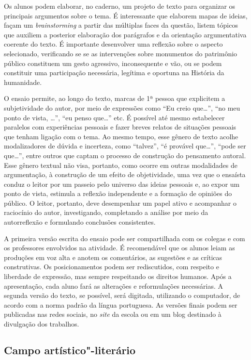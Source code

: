 \documentclass[11pt]{extarticle}
\begin{document}
\begin{enumerate}
\begin{enumerate}
\begin{enumerate}
Os alunos podem elaborar, no caderno, um projeto de texto para organizar
os principais argumentos sobre o tema. É interessante que elaborem mapas
de ideias, façam um \emph{brainstorming} a partir das múltiplas faces da
questão, listem tópicos que auxiliem a posterior elaboração dos
parágrafos e da orientação argumentativa coerente do texto. É importante
desenvolver uma reflexão sobre o aspecto selecionado, verificando se se
as intervenções sobre monumentos do patrimônio público constituem um
gesto agressivo, inconsequente e vão, ou se podem constituir uma
participação necessária, legítima e oportuna na História da humanidade.

O ensaio permite, ao longo do texto, marcas de 1ª pessoa que explicitem
a subjetividade do autor, por meio de expressões como ``Eu creio
que\ldots{}'', ``no meu ponto de vista, \ldots{}'', ``eu penso que\ldots{}'' etc. É
possível até mesmo estabelecer paralelos com experiências pessoais e
fazer breves relatos de situações pessoais que tenham ligação com o
tema. Ao mesmo tempo, esse gênero de texto acolhe modalizadores de
dúvida e incerteza, como ``talvez'', ``é provável que\ldots{}'', ``pode ser
que\ldots{}'', entre outros que captam o processo de construção do pensamento
autoral. Esse gênero textual não visa, portanto, como ocorre em outras
modalidades de argumentação, à construção de um efeito de objetividade,
uma vez que o ensaísta conduz o leitor por um passeio pelo universo das
ideias pessoais e, ao expor um ponto de vista, estimula a reflexão
independente e a formação de opiniões do público. O leitor, portanto,
deve desempenhar um papel ativo e acompanhar o raciocínio do autor,
investigando, completando a análise por meio da autorreflexão e
formulando conclusões consistentes.

A primeira versão escrita do ensaio pode ser compartilhada com os
colegas e com os professores envolvidos na atividade. É recomendável que
os alunos leiam as produções em voz alta e anotem os comentários, as
sugestões e as críticas construtivas. Os posicionamentos podem ser
rediscutidos, com respeito e liberdade de expressão, mas sempre
respeitando os direitos humanos. Após a apresentação, cada aluno fará as
alterações e reformulações necessárias. A segunda versão do texto, se possível, 
será digitada, utilizando o computador, de acordo com a norma padrão da
língua portuguesa. As versões finais podem ser publicadas nas redes
sociais, no \emph{site} da escola ou em um blog destinado à divulgação
dos trabalhos.

\subsection{Campo artístico"-literário}


\end{enumerate}
\end{enumerate}
\end{enumerate}
\end{document}
